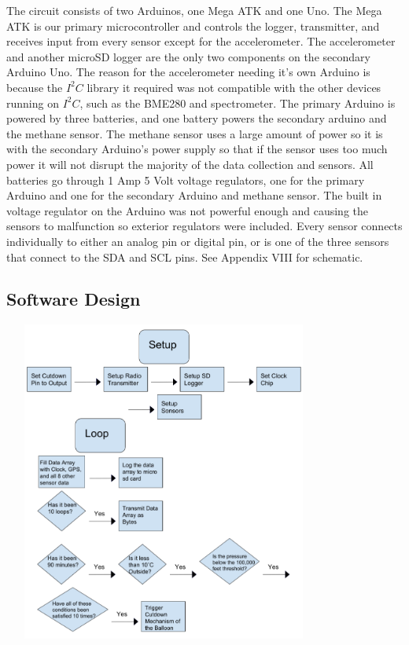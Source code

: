 \documentclass[12pt,]{article}
\begin{document}
The circuit consists of two Arduinos, one Mega ATK and one Uno. The Mega
ATK is our primary microcontroller and controls the logger, transmitter,
and receives input from every sensor except for the accelerometer. The
accelerometer and another microSD logger are the only two components on
the secondary Arduino Uno. The reason for the accelerometer needing it's
own Arduino is because the \(I^2C\) library it required was not
compatible with the other devices running on \(I^2C\), such as the
BME280 and spectrometer. The primary Arduino is powered by three
batteries, and one battery powers the secondary arduino and the methane
sensor. The methane sensor uses a large amount of power so it is with
the secondary Arduino's power supply so that if the sensor uses too much
power it will not disrupt the majority of the data collection and
sensors. All batteries go through 1 Amp 5 Volt voltage regulators, one
for the primary Arduino and one for the secondary Arduino and methane
sensor. The built in voltage regulator on the Arduino was not powerful
enough and causing the sensors to malfunction so exterior regulators
were included. Every sensor connects individually to either an analog
pin or digital pin, or is one of the three sensors that connect to the
SDA and SCL pins. See Appendix VIII for schematic.

\subsection{Software Design}\label{software-design}

\begin{center}\includegraphics[width=400px,height=400px]{assets/flow_code} \end{center}
\end{document}
